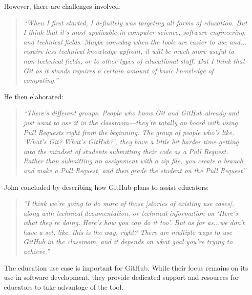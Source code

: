 However, there are challenges involved:
\begin{quote}\textit{``When I first started, I definitely was targeting all forms of education. But I think that it's most applicable in computer science, software engineering, and technical fields. Maybe someday when the tools are easier to use and... require less technical knowledge upfront, it will be much more useful to non-technical fields, or to other types of educational stuff. But I think that Git as it stands requires a certain amount of basic knowledge of computing.''}\end{quote}

He then elaborated:
\begin{quote}\textit{``There's different groups. People who know Git and GitHub already and just want to use it in the classroom---they're totally on board with using Pull Requests right from the beginning. The group of people who's like, `What's Git? What's GitHub?', they have a little bit harder time getting into the mindset of students submitting their code as a Pull Request. Rather than submitting an assignment with a zip file, you create a branch and make a Pull Request, and then grade the student on the Pull Request''}\end{quote}

John concluded by describing how GitHub plans to assist educators:
\begin{quote}\textit{``I think we're going to do more of those [stories of existing use cases], along with technical documentation, or technical information on `Here's what they're doing. Here's how you can do it too'. But as far as...we don't have a set, like, this is the way, right? There are multiple ways to use GitHub in the classroom, and it depends on what goal you're trying to achieve.''}\end{quote}

The education use case is important for GitHub. While their focus remains on its use in software development, they provide dedicated support and resources for educators to take advantage of the tool.

